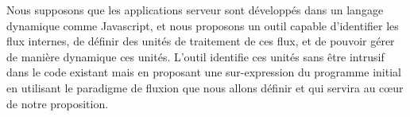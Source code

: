 Nous supposons que les applications serveur sont développés dans un langage dynamique comme Javascript, et nous proposons un outil capable d'identifier les flux internes, de définir des unités de traitement de ces flux, et de pouvoir gérer de manière dynamique ces unités.
L'outil identifie ces unités sans être intrusif dans le code existant mais en proposant une sur-expression du programme initial en utilisant le paradigme de fluxion que nous allons définir et qui servira au cœur de notre proposition.

